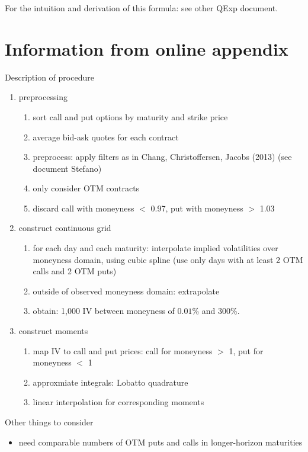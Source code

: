 \documentclass{article}
\begin{document}
For the intuition and derivation of this formula: see other QExp document.


\section{Information from online appendix}\label{sec:2}

Description of procedure
\begin{enumerate}
\item preprocessing
\begin{enumerate}
	\item sort call and put options by maturity and strike price
	\item average bid-ask quotes for each contract
	\item preprocess: apply filters as in Chang, Christoffersen, Jacobs (2013) (see document Stefano)
	\item only consider OTM contracts
	\item discard call with moneyness $<$ 0.97, put with moneyness $>$ 1.03
\end{enumerate}
\item construct continuous grid 
\begin{enumerate}
	\item for each day and each maturity: interpolate implied volatilities over moneyness domain, using cubic spline (use only days with at least 2 OTM calls and 2 OTM puts)
	\item outside of observed moneyness domain: extrapolate
	\item obtain: 1,000 IV between moneyness of $0.01$\% and $300$\%.
\end{enumerate}
\item construct moments
\begin{enumerate}
	\item map IV to call and put prices: call for moneyness $>$ 1, put for moneyness $<$ 1
	\item approxmiate integrals: Lobatto quadrature
	\item linear interpolation for corresponding moments
\end{enumerate}
\end{enumerate}

Other things to consider
\begin{itemize}
\item need comparable numbers of OTM puts and calls in longer-horizon maturities
\end{itemize}
\end{document}
